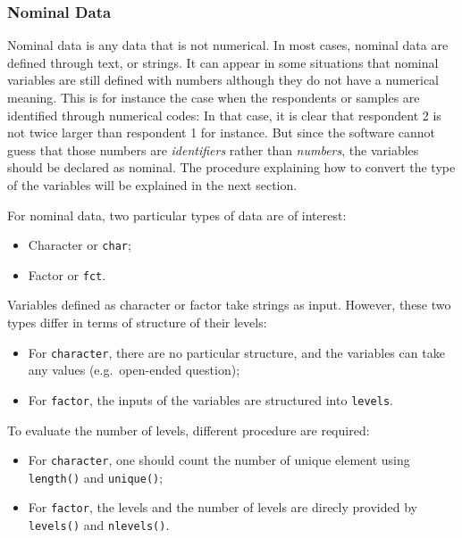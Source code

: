 \documentclass[
]{book}
\providecommand{\tightlist}{%
  \setlength{\itemsep}{0pt}\setlength{\parskip}{0pt}}
\begin{document}
\hypertarget{nominal-data}{%
\subsubsection{Nominal Data}\label{nominal-data}}

Nominal data is any data that is not numerical. In most cases, nominal data are defined through text, or strings. It can appear in some situations that nominal variables are still defined with numbers although they do not have a numerical meaning. This is for instance the case when the respondents or samples are identified through numerical codes: In that case, it is clear that respondent 2 is not twice larger than respondent 1 for instance. But since the software cannot guess that those numbers are \emph{identifiers} rather than \emph{numbers}, the variables should be declared as nominal. The procedure explaining how to convert the type of the variables will be explained in the next section.

For nominal data, two particular types of data are of interest:

\begin{itemize}
\tightlist
\item
  Character or \texttt{char};
\item
  Factor or \texttt{fct}.
\end{itemize}

Variables defined as character or factor take strings as input. However, these two types differ in terms of structure of their levels:

\begin{itemize}
\tightlist
\item
  For \texttt{character}, there are no particular structure, and the variables can take any values (e.g.~open-ended question);
\item
  For \texttt{factor}, the inputs of the variables are structured into \texttt{levels}.
\end{itemize}

To evaluate the number of levels, different procedure are required:

\begin{itemize}
\tightlist
\item
  For \texttt{character}, one should count the number of unique element using \texttt{length()} and \texttt{unique()};
\item
  For \texttt{factor}, the levels and the number of levels are direcly provided by \texttt{levels()} and \texttt{nlevels()}.
\end{itemize}
\end{document}
